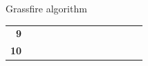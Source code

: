 \documentclass[compress,xcolor=table]{beamer}
\begin{document}
\begin{frame}{Grassfire algorithm}
\begin{center}
{\begin{tabular}{rcccccccccccc}
                \multicolumn{1}{r|}{\textbf{9}}  & \multicolumn{1}{c|}{}          & \multicolumn{1}{c|}{}                          & \multicolumn{1}{c|}{}                         & \multicolumn{1}{c|}{}                         & \multicolumn{1}{c|}{}                         & \multicolumn{1}{c|}{}          & \multicolumn{1}{c|}{}          & \multicolumn{1}{c|}{}                          & \multicolumn{1}{c|}{}                         & \multicolumn{1}{c|}{\cellcolor[HTML]{000000}} & \multicolumn{1}{c|}{}                         & \multicolumn{1}{c|}{}          \\ \cline{2-13} 
                \multicolumn{1}{r|}{\textbf{10}} & \multicolumn{1}{c|}{}          & \multicolumn{1}{c|}{}                          & \multicolumn{1}{c|}{}                         & \multicolumn{1}{c|}{}                         & \multicolumn{1}{c|}{}                         & \multicolumn{1}{c|}{}          & \multicolumn{1}{c|}{}          & \multicolumn{1}{c|}{}                          & \multicolumn{1}{c|}{}                         & \multicolumn{1}{c|}{\cellcolor[HTML]{000000}} & \multicolumn{1}{c|}{}                         & \multicolumn{1}{c|}{}          \\ \cline{2-13} 
            \end{tabular}
        }
\end{center}
\end{frame}
\end{document}

